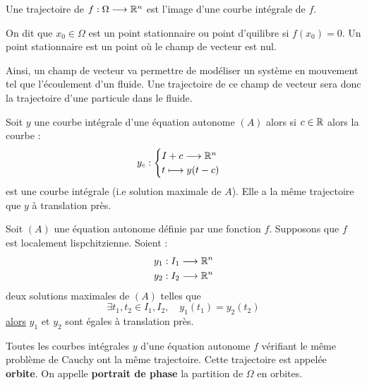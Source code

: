 \begin{definition}[Trajectoire]
    Une trajectoire de $f : \Omega \longrightarrow \mathbb{R}^n$ est l'image d'une courbe intégrale de $f$. 
\end{definition}

\begin{definition}
    On dit que $ x_0 \in \Omega$ est un point stationnaire ou point d'quilibre si $f(x_0) = 0$. 
    Un point stationnaire est un point où le champ de vecteur est nul. 
\end{definition}

Ainsi, un champ de vecteur va permettre de modéliser un système en mouvement tel que l'écoulement d'un fluide. 
Une trajectoire de ce champ de vecteur sera donc la trajectoire d'une particule dans le fluide. 

\begin{proposition}
    Soit $y$ une courbe intégrale d'une équation autonome $(A)$ alors si $c \in \mathbb{R}$ alors la courbe :
        \[ y_c : 
            \begin{cases}
                I + c \longrightarrow \mathbb{R}^n \\ 
                t \longmapsto y(t - c)
            \end{cases} \] 
    est une courbe intégrale (i.e solution maximale de $A$). Elle a la même trajectoire que $y$ à translation près. 
\end{proposition}

\begin{proposition}
    Soit $(A)$ une équation autonome définie par une fonction $f$. Supposons que $f$ est localement lispchitzienne. 
    Soient :
        \begin{align*}
            y_1 : I_1 \longrightarrow \mathbb{R}^n \\ 
            y_2 : I_2 \longrightarrow \mathbb{R}^n 
        \end{align*}
    deux solutions maximales de $(A)$ telles que 
        \[ \exists t_1, t_2 \in I_1, I_2, \quad y_1(t_1) = y_2(t_2) \] 
    \underline{alors} $y_1$ et $y_2$ sont égales à translation près. 
\end{proposition}

\begin{definition}[Orbite]
    Toutes les courbes intégrales $y$ d'une équation autonome $f$ vérifiant le même problème de Cauchy ont la même trajectoire. 
    Cette trajectoire est appelée \textbf{orbite}. 
    On appelle \textbf{portrait de phase} la partition de $\Omega$ en orbites.  
\end{definition}

